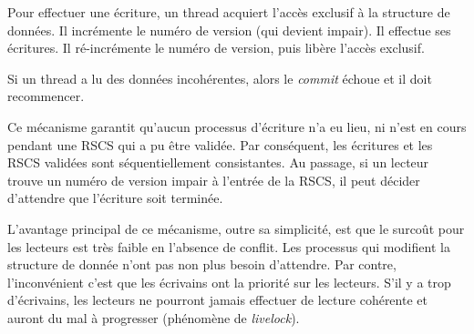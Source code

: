 Pour effectuer une écriture, un thread acquiert l'accès exclusif à la structure
de données. Il incrémente le numéro de version (qui devient impair). Il effectue
ses écritures. Il ré-incrémente le numéro de version, puis libère l'accès exclusif.

Si un thread a lu des données incohérentes, alors le \emph{commit} échoue et il
doit recommencer.



Ce mécanisme garantit qu'aucun processus d'écriture n'a eu lieu, ni n'est en
cours pendant une RSCS qui a pu être validée. Par conséquent, les écritures et
les RSCS validées sont séquentiellement consistantes.  Au passage, si un lecteur
trouve un numéro de version impair à l'entrée de la RSCS, il peut décider
d'attendre que l'écriture soit terminée.

L'avantage principal de ce mécanisme, outre sa simplicité, est que le surcoût
pour les lecteurs est très faible en l'absence de conflit. Les processus qui
modifient la structure de donnée n'ont pas non plus besoin d'attendre. Par
contre, l'inconvénient c'est que les écrivains ont la priorité sur les
lecteurs. S'il y a trop d'écrivains, les lecteurs ne pourront jamais effectuer
de lecture cohérente et auront du mal à progresser (phénomène de
\emph{livelock}).

